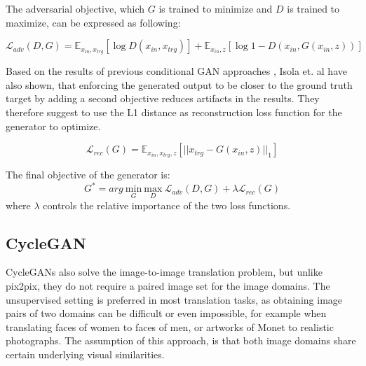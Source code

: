 \documentclass{article}
\begin{document}
The adversarial objective, which $G$ is trained to minimize and $D$ is trained to maximize, can be expressed as following:

\begin{equation}
\mathcal{L}_{adv}(D,G) = \mathbb{E}_{x_{in},x_{trg}}[\log D(x_{in},x_{trg})] + \mathbb{E}_{x_{in},z}[\log 1 - D(x_{in}, G(x_{in},z))]
\label{eq:pix2pix_minimax_cond}
\end{equation}

Based on the results of previous conditional GAN approaches \cite{pathak_context_2016}, Isola et. al \cite{isola_image--image_2016} have also shown, that enforcing the generated output to be closer to the ground truth target by adding a second objective reduces artifacts in the results. They therefore suggest to use the L1 distance as reconstruction loss function for the generator to optimize.

\begin{equation}
\mathcal{L}_{rec}(G) = \mathbb{E}_{x_{in},x_{trg},z}[||x_{trg}-G(x_{in},z)||_{1}]
\label{eq:pix2pix_loss_rec}
\end{equation}


The final objective of the generator is:
\begin{equation}
G^{*} = arg \ \underset{G}{\mathrm{min}} \ \underset{D}{\mathrm{max}} \ \mathcal{L}_{adv}(D,G) + \lambda \mathcal{L}_{rec}(G)
\end{equation}
where $\lambda$ controls the relative importance of the two loss functions.

\subsection{CycleGAN}
CycleGANs \cite{zhu_unpaired_2017} also solve the image-to-image translation problem, but unlike pix2pix, they do not require a paired image set for the image domains. The unsupervised setting is preferred in most translation tasks, as obtaining image pairs of two domains can be difficult or even impossible, for example when translating faces of women to faces of men, or artworks of Monet to realistic photographs. The assumption of this approach, is that both image domains share certain underlying visual similarities.
\end{document}

